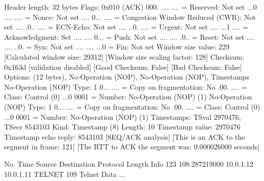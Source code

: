     Header length: 32 bytes
    Flags: 0x010 (ACK)
        000. .... .... = Reserved: Not set
        ...0 .... .... = Nonce: Not set
        .... 0... .... = Congestion Window Reduced (CWR): Not set
        .... .0.. .... = ECN-Echo: Not set
        .... ..0. .... = Urgent: Not set
        .... ...1 .... = Acknowledgment: Set
        .... .... 0... = Push: Not set
        .... .... .0.. = Reset: Not set
        .... .... ..0. = Syn: Not set
        .... .... ...0 = Fin: Not set
    Window size value: 229
    [Calculated window size: 29312]
    [Window size scaling factor: 128]
    Checksum: 0x163d [validation disabled]
        [Good Checksum: False]
        [Bad Checksum: False]
    Options: (12 bytes), No-Operation (NOP), No-Operation (NOP), Timestamps
        No-Operation (NOP)
            Type: 1
                0... .... = Copy on fragmentation: No
                .00. .... = Class: Control (0)
                ...0 0001 = Number: No-Operation (NOP) (1)
        No-Operation (NOP)
            Type: 1
                0... .... = Copy on fragmentation: No
                .00. .... = Class: Control (0)
                ...0 0001 = Number: No-Operation (NOP) (1)
        Timestamps: TSval 2970476, TSecr 8543103
            Kind: Timestamp (8)
            Length: 10
            Timestamp value: 2970476
            Timestamp echo reply: 8543103
    [SEQ/ACK analysis]
        [This is an ACK to the segment in frame: 121]
        [The RTT to ACK the segment was: 0.000026000 seconds]

No.     Time           Source                Destination           Protocol Length Info
    123 108.287219000  10.0.1.12             10.0.1.11             TELNET   109    Telnet Data ...

